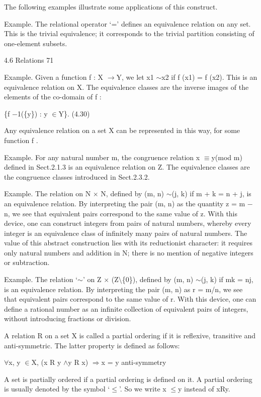 \documentclass[11pt]{article}
\theoremstyle{plain}
\theoremstyle{definition}
\begin{document}
The following examples illustrate some applications of this construct.

Example. The relational operator `=' defines an equivalence relation on any set. This is the trivial equivalence; it corresponds to the trivial partition consisting of one-element subsets.

4.6 Relations 71

Example. Given a function f : X $\to$Y, we let x1 $\sim$x2 if f (x1) = f (x2). This is an equivalence relation on X. The equivalence classes are the inverse images of the elements of the co-domain of f :

\{f $-$1(\{y\}) : y $\in$Y\}. (4.30)

Any equivalence relation on a set X can be represented in this way, for some function f .

Example. For any natural number m, the congruence relation x $\equiv$y(mod m) defined in Sect.2.1.3 is an equivalence relation on Z. The equivalence classes are the congruence classes introduced in Sect.2.3.2.

Example. The relation on N $\times$ N, defined by (m, n) $\sim$(j, k) if m + k = n + j, is an equivalence relation. By interpreting the pair (m, n) as the quantity z = m $-$n, we see that equivalent pairs correspond to the same value of z. With this device, one can construct integers from pairs of natural numbers, whereby every integer is an equivalence class of infinitely many pairs of natural numbers. The value of this abstract construction lies with its reductionist character: it requires only natural numbers and addition in N; there is no mention of negative integers or subtraction.

Example. The relation `$\sim$' on Z $\times$ (Z$\setminus$\{0\}), defined by (m, n) $\sim$(j, k) if mk = nj, is an equivalence relation. By interpreting the pair (m, n) as r = m/n, we see that equivalent pairs correspond to the same value of r. With this device, one can define a rational number as an infinite collection of equivalent pairs of integers, without introducing fractions or division.

A relation R on a set X is called a partial ordering if it is reflexive, transitive and anti-symmetric. The latter property is defined as follows:

$\forall$x, y $\in$X, (x R y $\land$y R x) $\Rightarrow$x = y anti-symmetry

A set is partially ordered if a partial ordering is defined on it. A partial ordering is usually denoted by the symbol `$\leq$'. So we write x $\leq$y instead of xRy.
\end{document}
